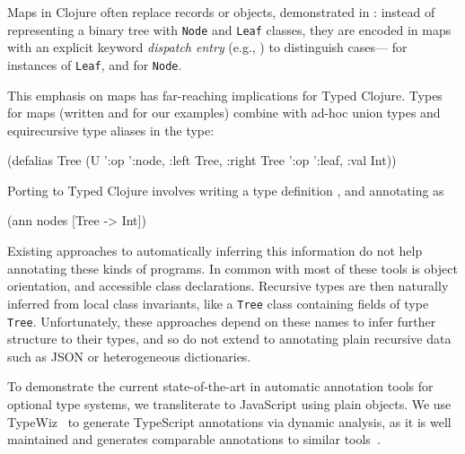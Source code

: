 Maps in Clojure often replace records or objects,
demonstrated in :
instead of representing a binary tree with \texttt{Node} and \texttt{Leaf} classes,
they are encoded in maps
with an explicit keyword \emph{dispatch entry} (e.g., ) to distinguish
cases--- for instances of \texttt{Leaf}, and
 for \texttt{Node}.

This emphasis on maps has far-reaching
implications for
Typed Clojure. %
Types for maps (written
 and
for our examples) combine with
ad-hoc union types and
equirecursive type aliases
in the type:
\begin{cljlisting}
(defalias Tree
  (U '{:op ':node, :left Tree, :right Tree}
     '{:op ':leaf, :val Int}))
\end{cljlisting}

Porting  to Typed Clojure involves writing a type definition
, and annotating  as
\begin{cljlisting}
(ann nodes [Tree -> Int])
\end{cljlisting}
Existing approaches to automatically inferring this information
do not help annotating these kinds of programs.
In common with most of these tools is
object orientation, %
and accessible class declarations.
Recursive types are then naturally inferred from local class invariants,
like a \texttt{Tree} class containing fields of type \texttt{Tree}.
Unfortunately, these approaches depend on these names to infer
further structure to their types, and so
do not extend to annotating plain recursive data
such as JSON or heterogeneous dictionaries.

To demonstrate the current state-of-the-art in automatic annotation tools for optional type systems,
we transliterate  to JavaScript using plain objects. 
We use TypeWiz~\cite{typewiz} to generate TypeScript annotations via dynamic analysis,
as it is well maintained and generates comparable annotations
to similar tools~\cite{saftoiu2010jstrace,pyannotate,typette18,An10dynamicinference,pytype,kristensen2017inference}.

